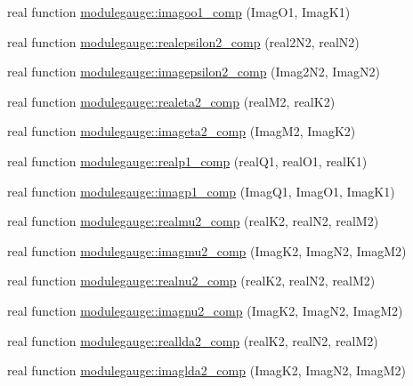 \begin{DoxyCompactItemize}
\item 
real function \mbox{\hyperlink{namespacemodulegauge_a2916ed439bb6cf0eacf5070d3fc179d7}{modulegauge\+::imagoo1\+\_\+comp}} (Imag\+O1, Imag\+K1)
\item 
real function \mbox{\hyperlink{namespacemodulegauge_a21ce68783e04b0fd7b9b57cc33bb1117}{modulegauge\+::realepsilon2\+\_\+comp}} (real2\+N2, real\+N2)
\item 
real function \mbox{\hyperlink{namespacemodulegauge_a28b6b5b37157cb9ca35800eacb09e7fc}{modulegauge\+::imagepsilon2\+\_\+comp}} (Imag2\+N2, Imag\+N2)
\item 
real function \mbox{\hyperlink{namespacemodulegauge_a56eb9e88f9dfa7360cdf57474d0371d0}{modulegauge\+::realeta2\+\_\+comp}} (real\+M2, real\+K2)
\item 
real function \mbox{\hyperlink{namespacemodulegauge_a86cfe6d4e8801b4ade2414988f7586a7}{modulegauge\+::imageta2\+\_\+comp}} (Imag\+M2, Imag\+K2)
\item 
real function \mbox{\hyperlink{namespacemodulegauge_a063b6192aa0376262853a2161d0f21da}{modulegauge\+::realp1\+\_\+comp}} (real\+Q1, real\+O1, real\+K1)
\item 
real function \mbox{\hyperlink{namespacemodulegauge_a45d6d9badd92c973e90b945525d4c23e}{modulegauge\+::imagp1\+\_\+comp}} (Imag\+Q1, Imag\+O1, Imag\+K1)
\item 
real function \mbox{\hyperlink{namespacemodulegauge_aba58a8476e1ed7afa1d32b6ec5119be3}{modulegauge\+::realmu2\+\_\+comp}} (real\+K2, real\+N2, real\+M2)
\item 
real function \mbox{\hyperlink{namespacemodulegauge_acb26f834d34705945913d60c75c3ce71}{modulegauge\+::imagmu2\+\_\+comp}} (Imag\+K2, Imag\+N2, Imag\+M2)
\item 
real function \mbox{\hyperlink{namespacemodulegauge_a3fe2f51cb87bda2360ce6930edea74fd}{modulegauge\+::realnu2\+\_\+comp}} (real\+K2, real\+N2, real\+M2)
\item 
real function \mbox{\hyperlink{namespacemodulegauge_a63b14124c79ff7d860721610832a3ef5}{modulegauge\+::imagnu2\+\_\+comp}} (Imag\+K2, Imag\+N2, Imag\+M2)
\item 
real function \mbox{\hyperlink{namespacemodulegauge_aa12106b28d4813b546feb45a0408ffa0}{modulegauge\+::reallda2\+\_\+comp}} (real\+K2, real\+N2, real\+M2)
\item 
real function \mbox{\hyperlink{namespacemodulegauge_a0f06a83482f5b7e22cfbc40e9f7e89f4}{modulegauge\+::imaglda2\+\_\+comp}} (Imag\+K2, Imag\+N2, Imag\+M2)
\item 

\end{DoxyCompactItemize}
